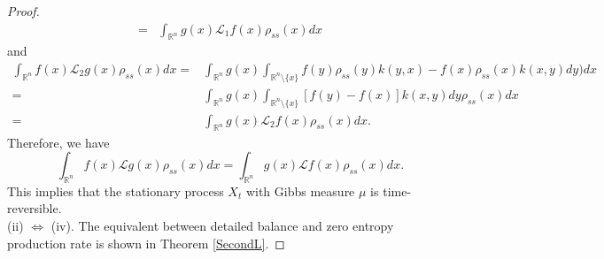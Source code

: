 \documentclass[10pt,a4paper]{amsart}
\begin{document}
\begin{proof}
\begin{align*}
     = & \int_{\mathbb{R}^n} g(x) \mathcal{L}_{1}f(x) \rho_{ss}(x)dx
\end{align*}
and
\begin{align*}
    \int_{\mathbb{R}^n} f(x) \mathcal{L}_{2}g(x) \rho_{ss}(x)dx = & \int_{\mathbb{R}^n} g(x) \int_{\mathbb{R}^{n}\setminus \{x\}}f(y) \rho_{ss}(y) k(y,x) - f(x) \rho_{ss}(x) k(x,y)dy)dx \\
    = &  \int_{\mathbb{R}^n} g(x) \int_{\mathbb{R}^{n}\setminus \{x\}} [f(y) - f(x)] k(x,y)dy\rho_{ss}(x) dx  \\
     = & \int_{\mathbb{R}^n} g(x) \mathcal{L}_{2}f(x) \rho_{ss}(x)dx.
\end{align*}
Therefore, we have
\begin{equation*}
    \int_{\mathbb{R}^n} f(x) \mathcal{L}g(x) \rho_{ss}(x)dx = \int_{\mathbb{R}^n} g(x) \mathcal{L} f(x) \rho_{ss}(x)dx.
\end{equation*}
This implies that the stationary process $X_t$ with Gibbs measure $\mu$ is time-reversible.\\
(ii) $\Leftrightarrow$ (iv). The equivalent between detailed balance and zero entropy production rate is shown in Theorem \ref{SecondL}.
\end{proof}
\end{document}
